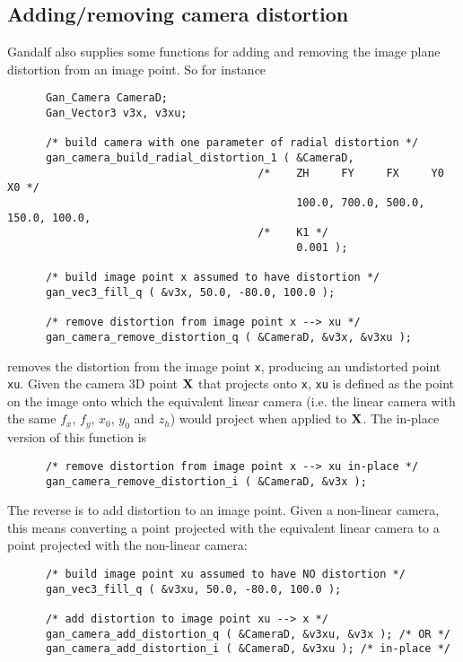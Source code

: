 \subsection{Adding/removing camera distortion}
Gandalf also supplies some functions for adding and removing the
image plane distortion from an image point. So for instance
\begin{verbatim}
      Gan_Camera CameraD;
      Gan_Vector3 v3x, v3xu;

      /* build camera with one parameter of radial distortion */
      gan_camera_build_radial_distortion_1 ( &CameraD,
                                       /*    ZH     FY     FX     Y0     X0 */
                                             100.0, 700.0, 500.0, 150.0, 100.0,
                                       /*    K1 */
                                             0.001 );

      /* build image point x assumed to have distortion */
      gan_vec3_fill_q ( &v3x, 50.0, -80.0, 100.0 );

      /* remove distortion from image point x --> xu */
      gan_camera_remove_distortion_q ( &CameraD, &v3x, &v3xu );
\end{verbatim}
removes the distortion from the image point {\tt x}, producing an
undistorted point {\tt xu}. Given the camera 3D point ${\bf X}$ that projects
onto {\tt x}, {\tt xu} is defined as the point on the image onto which the
equivalent linear camera (i.e. the linear camera with the same $f_x$, $f_y$,
$x_0$, $y_0$ and $z_h$) would project when applied to ${\bf X}$.
The in-place version of this function is
\begin{verbatim}
      /* remove distortion from image point x --> xu in-place */
      gan_camera_remove_distortion_i ( &CameraD, &v3x );
\end{verbatim}

The reverse is to add distortion to an image point. Given a non-linear camera,
this means converting a point projected with the equivalent linear camera
to a point projected with the non-linear camera:
\begin{verbatim}
      /* build image point xu assumed to have NO distortion */
      gan_vec3_fill_q ( &v3xu, 50.0, -80.0, 100.0 );

      /* add distortion to image point xu --> x */
      gan_camera_add_distortion_q ( &CameraD, &v3xu, &v3x ); /* OR */
      gan_camera_add_distortion_i ( &CameraD, &v3xu ); /* in-place */
\end{verbatim}

